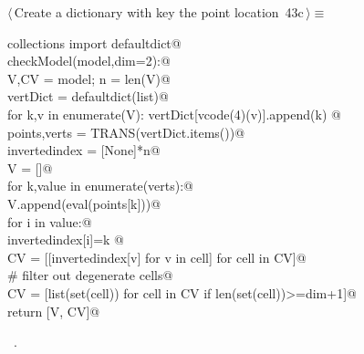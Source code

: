 \documentclass[11pt,oneside]{article}    %
\begin{document}
\begin{flushleft} \small \label{scrap72}
\protect{}$\langle\,$Create a dictionary with key the point location\nobreak\ {\footnotesize 43c}$\,\rangle\equiv$
\vspace{-1ex}
\begin{list}{}{} \item
\mbox{}\verb@from collections import defaultdict@\\
\mbox{}\verb@def checkModel(model,dim=2):@\\
\mbox{}\verb@    V,CV = model; n = len(V)@\\
\mbox{}\verb@    vertDict = defaultdict(list)@\\
\mbox{}\verb@    for k,v in enumerate(V): vertDict[vcode(4)(v)].append(k) @\\
\mbox{}\verb@    points,verts = TRANS(vertDict.items())@\\
\mbox{}\verb@    invertedindex = [None]*n@\\
\mbox{}\verb@    V = []@\\
\mbox{}\verb@    for k,value in enumerate(verts):@\\
\mbox{}\verb@        V.append(eval(points[k]))@\\
\mbox{}\verb@        for i in value:@\\
\mbox{}\verb@            invertedindex[i]=k    @\\
\mbox{}\verb@    CV = [[invertedindex[v] for v in cell] for cell in CV]@\\
\mbox{}\verb@    # filter out degenerate cells@\\
\mbox{}\verb@    CV = [list(set(cell)) for cell in CV if len(set(cell))>=dim+1]@\\
\mbox{}\verb@    return [V, CV]@\\
\mbox{}\verb@@{\NWsep}
\end{list}
\vspace{-1ex}
\footnotesize\addtolength{\baselineskip}{-1ex}
\begin{list}{}{\setlength{\itemsep}{-\parsep}\setlength{\itemindent}{-\leftmargin}}
\item \NWtxtMacroRefIn\ .
\end{list}
\end{flushleft}
\end{document}
